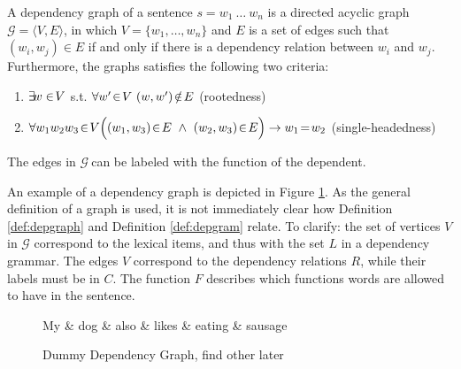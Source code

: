 \begin{definition}\label{def:depgraph}
A dependency graph of a sentence $s = w_1~\ldots~w_n$ is a directed acyclic graph $\mathcal{G} = \langle V, E\rangle$, in which $V = \{w_1, \ldots,w_n\}$ and $E$ is a set of edges such that $(w_i,w_j)\in E$ if and only if there is a dependency relation between $w_i$ and $w_j$. Furthermore, the graphs satisfies the following two criteria:
\begin{enumerate}
\item $\exists\negthinspace w\in\negthinspace V$ s.t. $\forall w'\negthinspace\in\negthinspace V~(w,w')\negthinspace\notin\negthinspace E$ \hfill (rootedness)
\item $\forall w_1 w_2 w_3\negthinspace \in\negthinspace V\Big( (w_1,w_3)\negthinspace\in\negthinspace E~\land~(w_2,w_3)\negthinspace \in\negthinspace E\Big) \rightarrow w_1\negthinspace=\negthinspace w_2$ \hfill (single-headedness)
\end{enumerate}
The edges in $\mathcal{G}~$can be labeled with the function of the dependent.
\end{definition}

\noindent An example of a dependency graph is depicted in Figure \ref{fig:depgraph}. As the general definition of a graph is used, it is not immediately clear how  Definition \ref{def:depgraph} and Definition \ref{def:depgram} relate. To clarify: the set of vertices $V$ in $\mathcal{G}$ correspond to the lexical items, and thus with the set $L$ in a dependency grammar. The edges $V$ correspond to the dependency relations $R$, while their labels must be in $C$. The function $F$ describes which functions words are allowed to have in the sentence. 

\begin{figure}[!ht]
\centering
\begin{dependency}[theme=simple]%
\begin{deptext}[column sep=.5cm, row sep=.1ex]
My \& dog \& also \& likes \& eating \& sausage \\
\end{deptext}
\end{dependency}
\caption{Dummy Dependency Graph, find other later}\label{fig:depgraph}
\end{figure}

